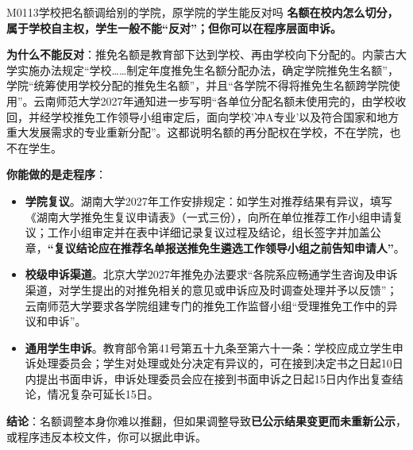 \begin{qa}{M0113}{学校把名额调给别的学院，原学院的学生能反对吗}
\textbf{名额在校内怎么切分，属于学校自主权，学生一般不能“反对”；但你可以在程序层面申诉。}

\textbf{为什么不能反对}：推免名额是教育部下达到学校、再由学校向下分配的。内蒙古大学实施办法规定“学校……制定年度推免生名额分配办法，确定学院推免生名额”，学院“统筹使用学校分配的推免生名额”，并且“各学院不得将推免生名额跨学院使用”。云南师范大学2027年通知进一步写明“各单位分配名额未使用完的，由学校收回，并经学校推免工作领导小组审定后，面向学校'冲A专业'以及符合国家和地方重大发展需求的专业重新分配”。这都说明名额的再分配权在学校，不在学院，也不在学生。

\textbf{你能做的是走程序}：
\begin{itemize}
  \item \textbf{学院复议}。湖南大学2027年工作安排规定：如学生对推荐结果有异议，填写《湖南大学推免生复议申请表》（一式三份），向所在单位推荐工作小组申请复议；工作小组审定并在表中详细记录复议过程及结论，组长签字并加盖公章，\textbf{“复议结论应在推荐名单报送推免生遴选工作领导小组之前告知申请人”}。
  \item \textbf{校级申诉渠道}。北京大学2027年推免办法要求“各院系应畅通学生咨询及申诉渠道，对学生提出的对推免相关的意见或申诉应及时调查处理并予以反馈”；云南师范大学要求各学院组建专门的推免工作监督小组“受理推免工作中的异议和申诉”。
  \item \textbf{通用学生申诉}。教育部令第41号第五十九条至第六十一条：学校应成立学生申诉处理委员会；学生对处理或处分决定有异议的，可在接到决定书之日起10日内提出书面申诉，申诉处理委员会应在接到书面申诉之日起15日内作出复查结论，情况复杂可延长15日。
\end{itemize}

\textbf{结论}：名额调整本身你难以推翻，但如果调整导致\textbf{已公示结果变更而未重新公示}，或程序违反本校文件，你可以据此申诉。
\end{qa}

